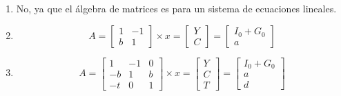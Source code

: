 \begin{ejercicio}
\begin{enumerate}
\[\begin{bmatrix}
            b_0 \\
            0 \\
            \alpha_0 \\
            \beta_0
        \end{bmatrix}
        \]
        \item No, ya que el álgebra de matrices es para un sistema de ecuaciones lineales.
        \item 
        \[
        A = \begin{bmatrix}
            1 & -1 \\
            b & 1 
        \end{bmatrix}
        \times
        x = \begin{bmatrix}
            Y \\
            C 
        \end{bmatrix}
        =
        \begin{bmatrix}
            I_0 + G_0 \\
            a
        \end{bmatrix}
        \]
        \item 
        \[
        A = \begin{bmatrix}
            1 & -1 & 0 \\
            -b & 1 & b \\
            -t & 0 & 1
        \end{bmatrix}
        \times
        x = \begin{bmatrix}
            Y \\
            C \\
            T 
        \end{bmatrix}
        = 
        \begin{bmatrix}
            I_0 + G_0 \\
            a \\
            d
        \end{bmatrix}
        \]
    \end{enumerate}
\end{ejercicio}

